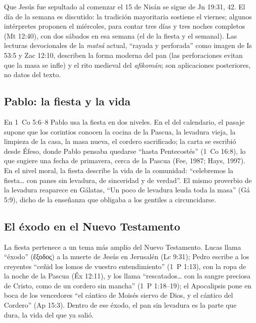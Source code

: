\documentclass[11pt,letterpaper]{article}
\newcommand{\grc}[1]{\foreignlanguage{ancientgreek}{#1}}
\begin{document}
\begin{nota}[Precisión]
Que Jesús fue sepultado al comenzar el 15 de Nisán se sigue de Jn 19:31, 42. El día de la semana es discutido: la tradición mayoritaria sostiene el viernes; algunos intérpretes proponen el miércoles, para contar tres días y tres noches completos (Mt 12:40), con dos sábados en esa semana (el de la fiesta y el semanal). Las lecturas devocionales de la \emph{matsá} actual, ``rayada y perforada'' como imagen de Is 53:5 y Zac 12:10, describen la forma moderna del pan (las perforaciones evitan que la masa se infle) y el rito medieval del \emph{afikomán}; son aplicaciones posteriores, no datos del texto.
\end{nota}

\subsection{Pablo: la fiesta y la vida}
En 1~Co 5:6--8 Pablo usa la fiesta en dos niveles. En el del calendario, el pasaje supone que los corintios conocen la cocina de la Pascua, la levadura vieja, la limpieza de la casa, la masa nueva, el cordero sacrificado; la carta se escribió desde Éfeso, donde Pablo pensaba quedarse ``hasta Pentecostés'' (1~Co 16:8), lo que sugiere una fecha de primavera, cerca de la Pascua (Fee, 1987; Hays, 1997). En el nivel moral, la fiesta describe la vida de la comunidad: ``celebremos la fiesta\ldots{} con panes sin levadura, de sinceridad y de verdad''. El mismo proverbio de la levadura reaparece en Gálatas, ``Un poco de levadura leuda toda la masa'' (Gá 5:9), dicho de la enseñanza que obligaba a los gentiles a circuncidarse.

\subsection{El éxodo en el Nuevo Testamento}
La fiesta pertenece a un tema más amplio del Nuevo Testamento. Lucas llama ``éxodo'' (\grc{ἔξοδος}) a la muerte de Jesús en Jerusalén (Lc 9:31); Pedro escribe a los creyentes ``ceñid los lomos de vuestro entendimiento'' (1~P 1:13), con la ropa de la noche de la Pascua (Éx 12:11), y los llama ``rescatados\ldots{} con la sangre preciosa de Cristo, como de un cordero sin mancha'' (1~P 1:18--19); el Apocalipsis pone en boca de los vencedores ``el cántico de Moisés siervo de Dios, y el cántico del Cordero'' (Ap 15:3). Dentro de ese éxodo, el pan sin levadura es la parte que dura, la vida del que ya salió.

\end{document}
